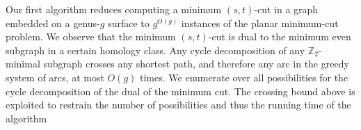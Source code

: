 \documentclass[natbib]{svcyclop}
\def\Z{\mathbb{Z}}
\begin{document}

Our first algorithm \cite{surfcut} reduces computing a minimum $(s,t)$-cut in a graph embedded on a genus-$g$ surface to $g^{O(g)}$ instances of the planar minimum-cut problem.
We observe that the minimum $(s,t)$-cut is dual to the minimum even subgraph in a certain homology class.
Any cycle decomposition of any $\Z_2$-minimal subgraph crosses any shortest path, and therefore any arc in the greedy system of arcs, at most $O(g)$ times.  We enumerate over all possibilities for the cycle decomposition of the dual of the minimum cut.  The crossing bound above is exploited to restrain the number of possibilities and thus the running time of the algorithm
\end{document}
